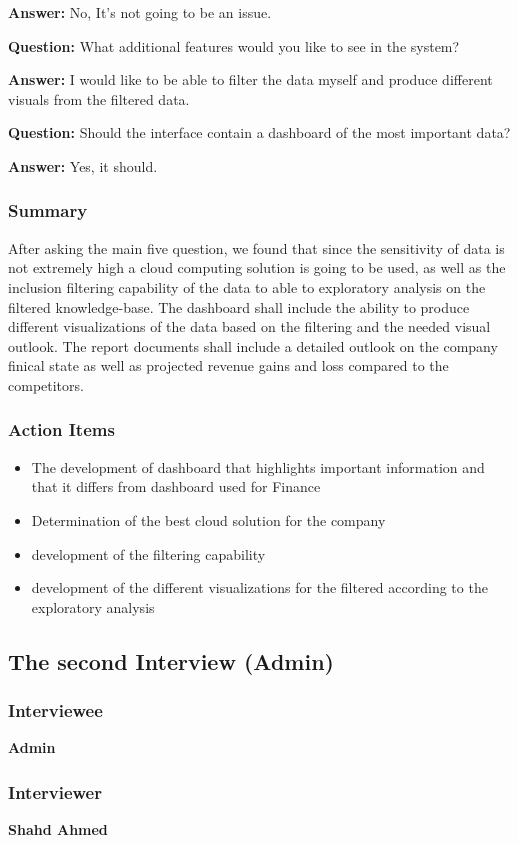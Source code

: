 \documentclass{article}
\begin{document}
\textbf{Answer:} No, It's not going to be an issue.

\textbf{Question:} What additional features would you like to see in the system?

\textbf{Answer:} I would like to be able to filter the data myself and produce different visuals from the filtered data.

\textbf{Question:} Should the interface contain a dashboard of the most important data?

\textbf{Answer:} Yes, it should.

\subsubsection{Summary}
After asking the main five question, we found that since the sensitivity of data is not extremely high a cloud computing solution is going to be used, as well as the inclusion filtering capability of the data to able to exploratory analysis on the filtered knowledge-base. The dashboard shall include the ability to produce different visualizations of the data based on the filtering and the needed visual outlook. The report documents shall include a detailed outlook on the company finical state as well as projected revenue gains and loss compared to the competitors.
\subsubsection{Action Items}
\begin{itemize}
    \item The development of dashboard that highlights important information and that it differs from dashboard used for Finance
    \item Determination of the best cloud solution for the company
    \item development of the filtering capability
    \item development of the different visualizations for the filtered according to the exploratory analysis
\end{itemize}

\subsection{The second Interview (Admin)}
\subsubsection{Interviewee}
\textbf{Admin}
\subsubsection{Interviewer}
\textbf{Shahd Ahmed}
\end{document}
